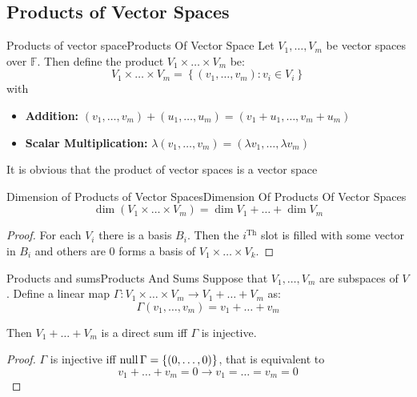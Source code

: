 \documentclass[../main.tex]{subfiles}
\begin{document}
\subsection{Products of Vector Spaces}
\begin{definition}{Products of vector space}{Products Of Vector Space}
Let $V_1, \ldots ,V_m$ be vector spaces over $\mathbb{F}$. Then define the product $V_1 \times \ldots \times V_m$ be:
\begin{equation}
V_1 \times \ldots \times V_m = \left\{ (v_1, \ldots , v_m): v_i\in V_i \right\}
\end{equation}
with
\begin{itemize}
\item \textbf{Addition: } $(v_1, \ldots , v_m) + (u_1, \ldots , u_m) = (v_1+u_1, \ldots ,v_m+u_m)$
\item \textbf{Scalar Multiplication: } $\lambda (v_1, \ldots , v_m) = (\lambda v_1, \ldots ,\lambda v_m)$
\end{itemize}
\end{definition}

It is obvious that the product of vector spaces is a vector space
\begin{theorem}{Dimension of Products of Vector Spaces}{Dimension Of Products Of Vector Spaces}
\begin{equation}
\dim (V_1 \times \ldots \times V_m) = \dim V_1+\ldots +\dim V_m
\end{equation}
\end{theorem}
\begin{proof}
For each $V_i$ there is a basis $B_i$. Then the $i^\text{Th}$ slot is filled with some vector in $B_i$ and others are $0$ forms a basis of $V_1 \times \ldots \times V_k$.
\end{proof}

\begin{theorem}{Products and sums}{Products And Sums}
Suppose that $V_1, \ldots ,V_m$ are subspaces of $V$. Define a linear map $\Gamma: V_1 \times \ldots \times V_m \rightarrow  V_1+\ldots +V_m$ as:
\begin{equation*}
\Gamma(v_1, \ldots ,v_m) = v_1+\ldots +v_m
\end{equation*}

Then $V_1+\ldots +V_m$ is a direct sum iff $\Gamma$ is injective.
\end{theorem}
\begin{proof}
$\Gamma$ is injective iff $\operatorname{null} \Gamma = \left\{ (0, \ldots ,0) \right\}$, that is equivalent to
\begin{equation*}
v_1+\ldots +v_m=0 \rightarrow v_1=\ldots =v_m=0
\end{equation*}
\end{proof}
\end{document}
